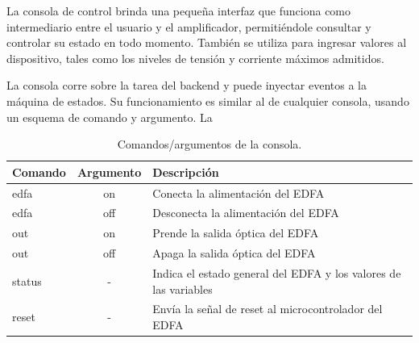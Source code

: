 
La consola de control brinda una pequeña interfaz que funciona como intermediario entre el usuario y el amplificador, permitiéndole consultar y controlar su estado en todo momento. También se utiliza para ingresar valores al dispositivo, tales como los niveles de tensión y corriente máximos admitidos.

La consola corre sobre la tarea del backend y puede inyectar eventos a la máquina de estados. Su funcionamiento es similar al de cualquier consola, usando un esquema de comando y argumento. La 

\begin{table}[H]
	\centering
	\caption{Comandos/argumentos de la consola.}
	\begin{tabular}{l c p{8cm}}
		\toprule
		\textbf{Comando} & \textbf{Argumento} & \textbf{Descripción} \\
		\midrule
		edfa	& on & Conecta la alimentación del EDFA	\\
		edfa	& off & Desconecta la alimentación del EDFA	 \\
		out	& on & Prende la salida óptica del EDFA \\
		out   & off & Apaga la salida óptica del EDFA \\
		status & - & Indica el estado general del EDFA y los valores de las variables \\
		reset & - & Envía la señal de reset al microcontrolador del EDFA \\
		\bottomrule
		\hline
	\end{tabular}
	\label{tab:tablacmd}
\end{table}